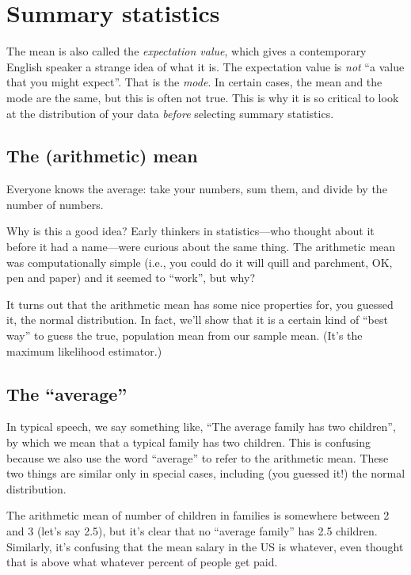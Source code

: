 \documentclass{book}
\begin{document}
\section{Summary statistics}\label{summary-statistics}

The mean is also called the \emph{expectation value}, which gives a
contemporary English speaker a strange idea of what it is. The
expectation value is \emph{not} ``a value that you might expect''. That
is the \emph{mode}. In certain cases, the mean and the mode are the
same, but this is often not true. This is why it is so critical to look
at the distribution of your data \emph{before} selecting summary
statistics.

\subsection{The (arithmetic) mean}\label{the-arithmetic-mean}

Everyone knows the average: take your numbers, sum them, and divide by
the number of numbers.

Why is this a good idea? Early thinkers in statistics---who thought
about it before it had a name---were curious about the same thing. The
arithmetic mean was computationally simple (i.e., you could do it will
quill and parchment, OK, pen and paper) and it seemed to ``work'', but
why?

It turns out that the arithmetic mean has some nice properties for, you
guessed it, the normal distribution. In fact, we'll show that it is a
certain kind of ``best way'' to guess the true, population mean from our
sample mean. (It's the maximum likelihood estimator.)

\subsection{The ``average''}

In typical speech, we say something like, ``The average family has two
children'', by which we mean that a typical family has two children.
This is confusing because we also use the word ``average'' to refer to
the arithmetic mean. These two things are similar only in special cases,
including (you guessed it!) the normal distribution.

The arithmetic mean of number of children in families is somewhere
between 2 and 3 (let's say 2.5), but it's clear that no ``average
family'' has 2.5 children. Similarly, it's confusing that the mean
salary in the US is whatever, even thought that is above what whatever
percent of people get paid.
\end{document}

